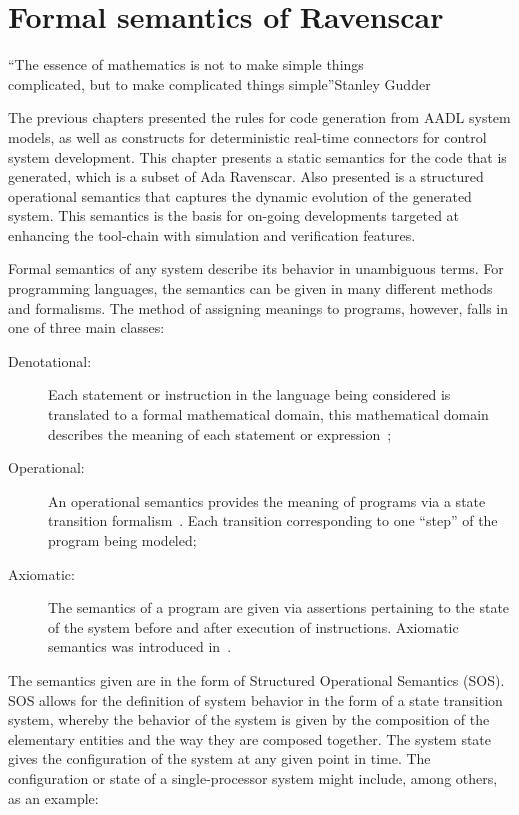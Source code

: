 \chapter{Formal semantics of Ravenscar}{``The essence of
  mathematics is not to make simple things\\complicated, but to make
  complicated things simple''}{Stanley Gudder}
\label{chap:formal_sem}

The previous chapters presented the rules for code generation from
AADL system models, as well as constructs for deterministic real-time
connectors for control system development. This chapter presents a
static semantics for the code that is generated, which is a subset of
Ada Ravenscar. Also presented is a structured operational semantics
that captures the dynamic evolution of the generated system. This
semantics is the basis for on-going developments targeted at enhancing
the tool-chain with simulation and verification features.

Formal semantics of any system describe its behavior in unambiguous
terms. For programming languages, the semantics can be given in many
different methods and formalisms. The method of assigning meanings to
programs, however, falls in one of three main classes:\\

\begin{description}
\item[Denotational:]{Each statement or instruction in the language
  being considered is translated to a formal mathematical domain, this
  mathematical domain describes the meaning of each statement or
  expression~\cite{tennent@cacm76};}
\item[Operational:]{An operational semantics provides the meaning of
  programs via a state transition formalism~\cite{plotkin-sos}. Each
  transition corresponding to one ``step'' of the program being
  modeled;}
\item[Axiomatic:]{The semantics of a program are given via assertions
  pertaining to the state of the system before and after execution of
  instructions. Axiomatic semantics was introduced
  in~\cite{floyd@macs67, hoare@cacm69}.}
\end{description}

The semantics given are in the form of Structured Operational
Semantics (SOS). SOS allows for the definition of system behavior in
the form of a state transition system, whereby the behavior of the
system is given by the composition of the elementary entities and the
way they are composed together. The system state gives the
configuration of the system at any given point in time. The
configuration or state of a single-processor system might include,
among others, as an example:

